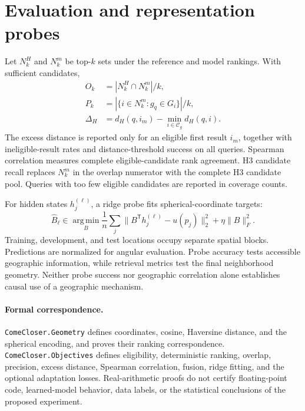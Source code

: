 \documentclass[10pt]{article}
\begin{document}
\section{Evaluation and representation probes}
Let $N_k^H$ and $N_k^m$ be top-$k$ sets under the reference and model rankings. With sufficient candidates,
\begin{align}
O_k&=|N_k^H\cap N_k^m|/k,\\
P_k&=|\{i\in N_k^m:g_q\in G_i\}|/k,\\
\Delta_H&=d_H(q,i_m)-\min_{i\in\mathcal C_g}d_H(q,i).
\end{align}
The excess distance is reported only for an eligible first result $i_m$, together with ineligible-result rates and distance-threshold success on all queries. Spearman correlation measures complete eligible-candidate rank agreement. H3 candidate recall replaces $N_k^m$ in the overlap numerator with the complete H3 candidate pool. Queries with too few eligible candidates are reported in coverage counts.

For hidden states $h_j^{(\ell)}$, a ridge probe fits spherical-coordinate targets:
\begin{equation}
\widehat B_\ell\in\operatorname*{arg\,min}_B
\frac1n\sum_j\lVert B^{\mathsf T}h_j^{(\ell)}-u(p_j)\rVert_2^2+
\eta\lVert B\rVert_F^2.
\end{equation}
Training, development, and test locations occupy separate spatial blocks. Predictions are normalized for angular evaluation. Probe accuracy tests accessible geographic information, while retrieval metrics test the final neighborhood geometry. Neither probe success nor geographic correlation alone establishes causal use of a geographic mechanism.

\paragraph{Formal correspondence.}
\texttt{ComeCloser.Geometry} defines coordinates, cosine, Haversine distance, and the spherical encoding, and proves their ranking correspondence. \texttt{ComeCloser.Objectives} defines eligibility, deterministic ranking, overlap, precision, excess distance, Spearman correlation, fusion, ridge fitting, and the optional adaptation losses. Real-arithmetic proofs do not certify floating-point code, learned-model behavior, data labels, or the statistical conclusions of the proposed experiment.
\end{document}
